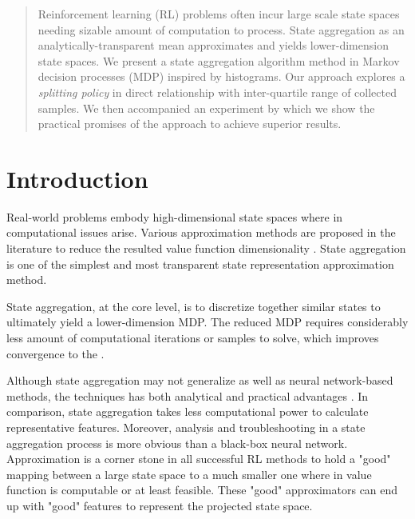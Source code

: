 \documentclass{article}
\begin{document}
\printAffiliationsAndNotice{\icmlEqualContribution} %


\begin{abstract}
    Reinforcement learning (RL) problems often incur large scale state spaces needing sizable amount
    of computation to process.
    State aggregation as an analytically-transparent mean approximates and yields lower-dimension state spaces.
    We present a state aggregation algorithm method in Markov decision processes (MDP) inspired by histograms.
    Our approach explores a \textit{splitting policy} in direct relationship with inter-quartile range
    of collected samples.
    We then accompanied an experiment by which we show the practical promises of the approach to achieve superior
    results.
\end{abstract}


\section{Introduction}
\label{sec:intro}
    Real-world problems embody high-dimensional state spaces where in computational issues
    arise.
    Various approximation methods are proposed in the literature to reduce the resulted value function
    dimensionality \cite{Sutton1998, Busoniu2010, Francois-Lavet2018}.
    State aggregation is one of the simplest and most transparent state representation approximation
    method.

    State aggregation, at the core level, is to discretize together similar states to ultimately yield a
    lower-dimension MDP. The reduced MDP requires considerably less amount of computational iterations or samples to
    solve, which improves convergence to the .

    Although state aggregation may not generalize as well as neural network-based methods, the techniques has both
    analytical and practical advantages \cite{Lagoudakis2003}.
    In comparison, state aggregation takes less computational power to calculate representative features.
    Moreover, analysis and troubleshooting in a state aggregation process is more obvious than a black-box neural
    network.
    Approximation is a corner stone in all successful RL methods to hold a "good" mapping between a large state
    space to a much smaller one where in value function is computable or at least feasible.
    These "good" approximators can end up with "good" features to represent the projected state space.
\end{document}
